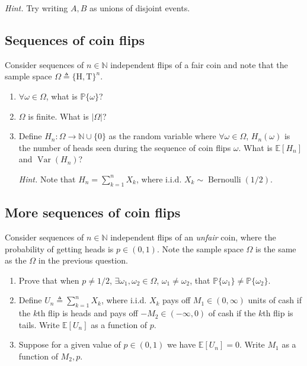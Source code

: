 \documentclass{article}
\numberwithin{equation}{section}
\begin{document}
\medskip

\textit{Hint.} Try writing $ A, B $ as unions of disjoint events.

\subsection{Sequences of coin flips}

Consider sequences of $ n \in \mathbb{N} $ independent flips of a fair coin
and note that the sample space $ \Omega \triangleq \{\text{H}, \text{T}\}^n $.
\begin{enumerate}[label = \alph*.]
    \item
    $ \forall \omega \in \Omega $, what is $ \mathbb{P}\{\omega\} $?

    \item
    $ \Omega $ is finite. What is $ |\Omega| $?

    \item
    Define $ H_n : \Omega \rightarrow \mathbb{N} \cup \{0\} $ as the random
    variable where $ \forall \omega \in \Omega $, $ H_n(\omega) $ is the
    number of heads seen during the sequence of coin flips $ \omega $. What
    is $ \mathbb{E}[H_n] $ and $ \operatorname{Var}(H_n) $?

    \medskip
    
    \textit{Hint.} Note that $ H_n = \sum_{k = 1}^nX_k $, where i.i.d.
    $ X_k \sim \operatorname{Bernoulli}(1 / 2) $.
\end{enumerate}

\subsection{More sequences of coin flips}

Consider sequences of $ n \in \mathbb{N} $ independent flips of an
\textit{unfair} coin, where the probability of getting heads is
$ p \in (0, 1) $. Note the sample space $ \Omega $ is the same as the
$ \Omega $ in the previous question.
\begin{enumerate}[label = \alph*.]
    \item
    Prove that when $ p \ne 1 / 2 $, $ \exists \omega_1, \omega_2 \in
    \Omega $, $ \omega_1 \ne \omega_2 $, that $ \mathbb{P}\{\omega_1\} \ne
    \mathbb{P}\{\omega_2\} $.

    \item
    Define $ U_n \triangleq \sum_{k = 1}^nX_k $, where i.i.d.
    $ X_k $ pays off $ M_1 \in (0, \infty) $ units of cash if the $ k $th
    flip is heads and pays off $ -M_2 \in (-\infty, 0) $ of cash if the
    $ k $th flip is tails. Write $ \mathbb{E}[U_n] $ as a function of $ p $.

    \item
    Suppose for a given value of $ p \in (0, 1) $ we have
    $ \mathbb{E}[U_n] = 0 $. Write $ M_1 $ as a function of $ M_2, p $.
\end{enumerate}
\end{document}
